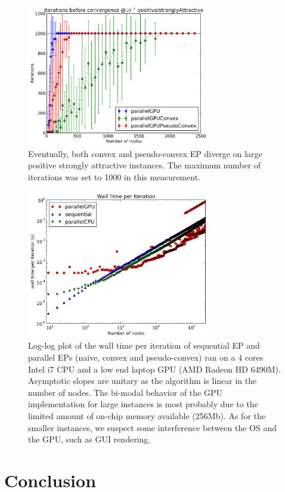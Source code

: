 \documentclass[times, 10pt,twocolumn]{article}
\begin{document}
\begin{figure}\centering
	\includegraphics[width=8cm]{plots/sizes/Iterations_before_convergence_e-4_positive_stronglyAttractive.png}
	\caption{Eventually, both convex and pseudo-convex EP diverge on large positive strongly attractive instances. The maximum number of iterations was set to 1000 in this measurement.}
\end{figure}

\begin{figure}\centering
	\includegraphics[width=8cm]{plots/sizes/time_per_iteration.png}
	\caption{Log-log plot of the wall time per iteration of sequential EP and parallel EPs (naive, convex and pseudo-convex) ran on a 4 cores Intel i7 CPU and a low end laptop GPU (AMD Radeon HD 6490M). Asymptotic slopes are unitary as the algorithm is linear in the number of nodes. The bi-modal behavior of the GPU implementation for large instances is most probably due to the limited amount of on-chip memory available (256Mb). As for the smaller instances, we suspect some interference between the OS and the GPU, such as GUI rendering.}
\end{figure}


\section{Conclusion}


\nocite{ex1,ex2}


\end{document}
